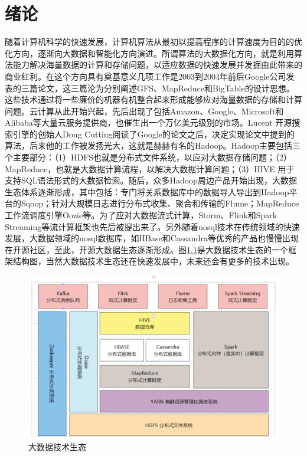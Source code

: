 \documentclass[twoside,a4paper,12pt]{book}%
\begin{document}
\chapter{绪论}
随着计算机科学的快速发展，计算机算法从最初以提高程序的计算速度为目的的优化方向，逐渐向大数据和智能化方向演进。所谓算法的大数据化方向，就是利用算法能力解决海量数据的计算和存储问题，以适应数据的快速发展并发掘由此带来的商业红利。在这个方向具有奠基意义几项工作是2003到2004年前后Google公司发表的三篇论文，这三篇沦为分别阐述GFS、MapReduce和BigTable的设计思想。这些技术通过将一些廉价的机器有机整合起来形成能够应对海量数据的存储和计算问题。云计算从此开始兴起，先后出现了包括Amazon、Google、Microsoft和Alibaba等大量云服务提供商，也催生出一个万亿美元级别的市场。Lucent 开源搜索引擎的创始人Doug Cutting阅读了Google的论文之后，决定实现论文中提到的算法，后来他的工作被发扬光大，这就是赫赫有名的Hadoop。Hadoop主要包括三个主要部分：（1）HDFS也就是分布式文件系统，以应对大数据存储问题；（2）MapReduce，也就是大数据计算流程，以解决大数据计算问题；（3）HIVE 用于支持SQL语法形式的大数据检索。随后，众多Hadoop周边产品开始出现，大数据生态体系逐渐形成，其中包括：专门将关系数据库中的数据导入导出到Hadoop平台的Sqoop；针对大规模日志进行分布式收集、聚合和传输的Flume；MapReduce工作流调度引擎Oozie等。为了应对大数据流式计算，Storm、Flink和Spark Streaming等流计算框架也先后被提出来了。另外随着nosql技术在传统领域的快速发展，大数据领域的nosql数据库，如HBase和Cassandra等优秀的产品也慢慢出现在开源社区，至此，开源大数据生态逐渐形成。图\ref{fig:bigdata}是大数据技术生态的一个框架结构图，当然大数据技术生态还在快速发展中，未来还会有更多的技术出现。
\begin{figure}[htbp]
	\centering
	\includegraphics[width=0.99\linewidth]{figures/bigdata.png}
	\caption{大数据技术生态}
	\label{fig:bigdata}
\end{figure}
\end{document}
